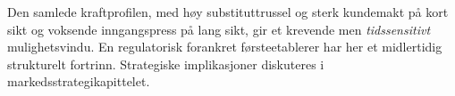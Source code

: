 \documentclass[12pt, a4paper]{article}
\begin{document}
Den samlede kraftprofilen, med høy substituttrussel og sterk kundemakt på kort
sikt og
voksende inngangspress på lang sikt, gir et krevende men
\textit{tidssensitivt}
mulighetsvindu. En regulatorisk forankret førsteetablerer har her et
midlertidig
strukturelt fortrinn. Strategiske implikasjoner diskuteres i
markedsstrategikapittelet.

\printbibliography[title={Referanseliste}]
\end{document}
